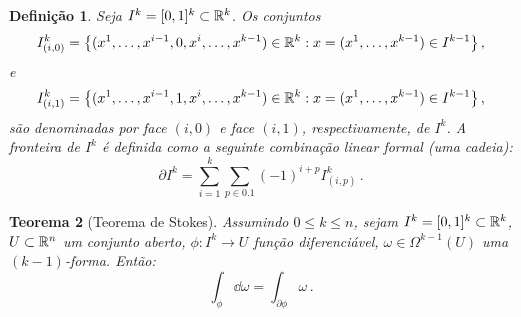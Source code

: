 \documentclass[a4paper,12pt]{extreport}
\newtheorem{mydef}{Definição}
\newtheorem{myteo}[mydef]{Teorema}
\newif\ifspacesbetweentheos
\newcommand{\theospace}[1]{
\ifspacesbetweentheos
  \vspace{#1}
\fi
}
\begin{document}
\begin{mydef}
  Seja $I^k = [0, 1]^k \subset \mathbb{R}^k$.
  Os conjuntos
  \begin{equation}
    I^k_{(i,0)} = \qty{
      (x^1, \dots, x^{i-1}, 0, x^{i}, \dots, x^{k-1}) \in \ensuremath{\mathbb{R}}^k :
      x = (x^1, \dots, x^{k-1}) \in I^{k-1}
    } \,,
  \end{equation}
  e
  \begin{equation}
    I^k_{(i,1)} = \qty{
      (x^1, \dots, x^{i-1}, 1, x^{i}, \dots, x^{k-1}) \in \ensuremath{\mathbb{R}}^k :
      x = (x^1, \dots, x^{k-1}) \in I^{k-1}
    } \,,
  \end{equation}
  são denominadas por \emph{face $(i,0)$ e face $(i,1)$},
  respectivamente, de $I^k$.
  A \emph{fronteira} de $I^k$ é definida como
  a seguinte combinação linear formal (uma \emph{cadeia}):
  \begin{equation}
    \partial I^k = \sum_{i=1}^k \sum_{p\in \qty{0, 1}} (-1)^{i+p} I^k_{(i,p)}\,.
  \end{equation}
\end{mydef}


\theospace{5cm}


\begin{myteo}[Teorema de Stokes]
  Assumindo $0 \le k \le n$,
  sejam $I^k = [0, 1]^k \subset \mathbb{R}^k$,
  $U \subset \mathbb{R}^n$ um conjunto aberto,
  $\phi: I^k \to U$ função diferenciável,
  $\omega \in \Omega^{k-1}(U)$ uma $(k-1)$-forma.
  Então:
  \begin{equation}
    \int_\phi \dd \omega = \int_{\partial\phi} \omega \,.
  \end{equation}
  
\end{myteo}
\end{document}
